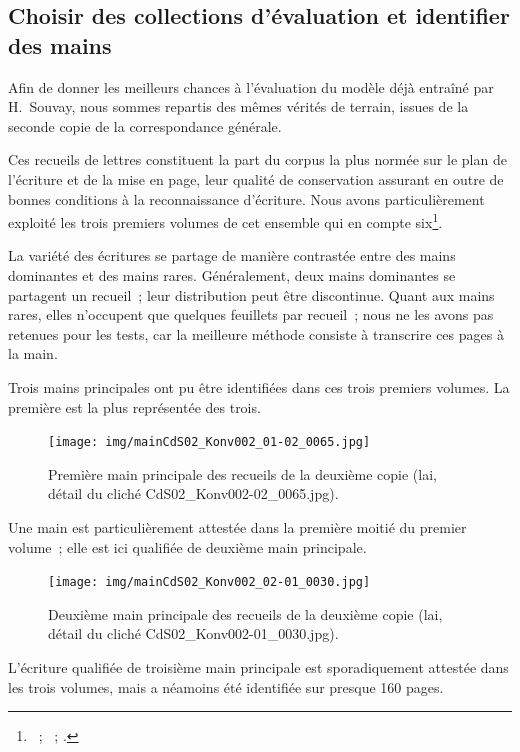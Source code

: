 \documentclass[a4paper,12pt,twoside]{book}
\begin{document}
			\subsection{Choisir des collections d'évaluation et identifier des mains}
				Afin de donner les meilleurs chances à l'évaluation du modèle déjà entraîné par H.~Souvay, nous sommes repartis des mêmes vérités de terrain, issues de la seconde copie de la correspondance générale.
				
				Ces recueils de lettres constituent la part du corpus la plus normée sur le plan de l'écriture et de la mise en page, leur qualité de conservation assurant en outre de bonnes conditions à la reconnaissance d'écriture. Nous avons particulièrement exploité les trois premiers volumes de cet ensemble qui en compte six\footnote{\cite{CdS02001330}~; \cite{CdS02001369}~; \cite{CdS02001334}.}.
				
				La variété des écritures se partage de manière contrastée entre des mains dominantes et des mains rares. Généralement, deux mains dominantes se partagent un recueil~; leur distribution peut être discontinue. Quant aux mains rares, elles n'occupent que quelques feuillets par recueil~; nous ne les avons pas retenues pour les tests, car la meilleure méthode consiste à transcrire ces pages à la main.
				
				Trois mains principales ont pu être identifiées dans ces trois premiers volumes. La première est la plus représentée des trois.
				
				\begin{figure}[!h]
					\centering
					\texttt{[image: img/mainCdS02\_Konv002\_01-02\_0065.jpg]}
					\caption{Première main principale des recueils de la deuxième copie (\gls{lai}, détail du cliché CdS02\_Konv002-02\_0065.jpg).}
					\label{}
				\end{figure}
			
				Une main est particulièrement attestée dans la première moitié du premier volume~; elle est ici qualifiée de \og deuxième main principale\fg.
				
				\begin{figure}[!h]
					\centering
					\texttt{[image: img/mainCdS02\_Konv002\_02-01\_0030.jpg]}
					\caption{Deuxième main principale des recueils de la deuxième copie (\gls{lai}, détail du cliché CdS02\_Konv002-01\_0030.jpg).}
					\label{}
				\end{figure}
			
				L'écriture qualifiée de \og troisième main principale \fg{} est sporadiquement attestée dans les trois volumes, mais a néamoins été identifiée sur presque 160 pages.
			
\end{document}
